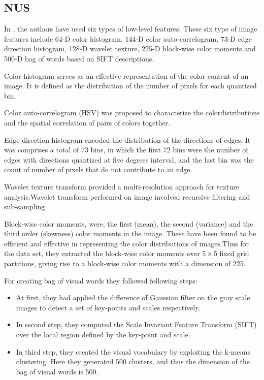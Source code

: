 \subsection{NUS}

In \citet*{NUS}, the authors have used six types of low-level features. These six type of image features include 64-D color 
histogram, 144-D color auto-correlogram, 73-D edge direction histogram, 128-D wavelet texture, 225-D block-wise color moments and 500-D bag of words based on SIFT descriptions. 

Color histogram serves as an effective representation of the color content of an image. It is defined as the distribution of the
number of pixels for each quantized bin.

Color auto-correlogram (HSV) was proposed to characterize the colordistributions and the spatial correlation of pairs of colors
together. 

Edge direction histogram encoded the distribution of the directions of edges. It was comprises a total of 73 bins, in which the first 72 bins were the number of edges with directions quantized at five degrees interval, and the last bin was the count of number of pixels that do not contribute to an edge.

Wavelet texture  transform provided a multi-resolution approach for texture analysis.Wavelet transform performed on image involved recursive filtering and sub-sampling

Block-wise color moments, were, the first (mean), the second (variance) and the third order (skewness)
color moments in the image. These have been found to be efficient and effective in representing the color distributions of images.Thus for the data set, they extracted the block-wise color moments over $5\times5$ fixed grid partitions, giving rise to a block-wise color moments with a dimension of 225.


For creating bag of visual words they followed following steps:
\begin{itemize}
\item At first, they had applied the difference of Gaussian filter on the gray scale images to detect a set of key-points and scales respectively. 
\item In second step, they computed the Scale Invariant Feature Transform (SIFT) over the local region defined by the key-point and scale.
\item In third step, they created the visual vocabulary by exploiting the k-means clustering. Here they generated 500 clusters, and
thus the dimension of the bag of visual words is 500.
\end{itemize}

